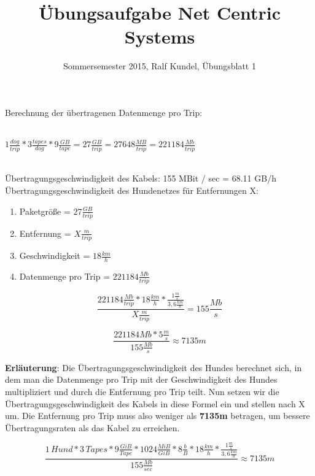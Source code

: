 \documentclass[a4paper,
			llpt,
			solution,
			accentcolor=tud2d,
			colorbacktitle
			]
			{tudexercise}
\title{Übungsaufgabe Net Centric Systems}
\subtitle{Sommersemester 2015, Ralf Kundel, Übungsblatt 1}
\begin{document}
\maketitle

\section{}
Berechnung der übertragenen Datenmenge pro Trip:
\\\\
\centerline{
$
    1 \frac{dog}{trip} * 3 \frac{tapes}{dog} * 9 \frac{GB}{tape} = 27 \frac{GB}{trip} = 27648 \frac{MB}{trip} = 221184\frac{Mb}{trip}
$
}
\\

Übertragungsgeschwindigkeit des Kabels:
    155 MBit / sec = 68.11 GB/h
\\

Übertragungsgeschwindigkeit des Hundenetzes für Entfernungen X:
\begin{enumerate}
\item    Paketgröße = $27 \frac{GB}{trip}$
\item    Entfernung = $X \frac{m}{trip}$
\item    Geschwindigkeit = $18 \frac{km}{h}$
\item	 Datenmenge pro Trip = $221184\frac{Mb}{trip}$
\end{enumerate}



$$
\frac{221184\frac{Mb}{trip} * 18 \frac{km}{h} * \frac{1\frac{m}{s}}{3,6\frac{km}{h}}}{X\frac{m}{trip}}
=
155 \frac{Mb}{s}
$$

$$
\frac{221184 Mb * 5 \frac{m}{s}}{155 \frac{Mb}{s}}
\approx
7135 m
$$

\noindent \textbf{Erläuterung}:
Die Übertragungsgeschwindigkeit des Hundes berechnet sich, in dem man die Datenmenge pro Trip mit der Geschwindigkeit des Hundes multipliziert und durch die Entfernung pro Trip teilt.
Nun setzen wir die Übertragungsgeschwindigkeit des Kabels in diese Formel ein und stellen nach X um.
Die Entfernung pro Trip muss also weniger als \textbf{7135m} betragen, um bessere Übertragungsraten als das Kabel zu erreichen.

$$
\frac{1\,Hund * 3\,Tapes * 9 \frac{GiB}{Tape} * 1024\frac{MiB}{GiB} * 8 \frac{b}{B} * 18 \frac{km}{h} * \frac{1\frac{m}{s}}{3,6\frac{km}{h}}}{155 \frac{Mb}{sec}}
\approx
7135 m
$$
              
\end{document}
